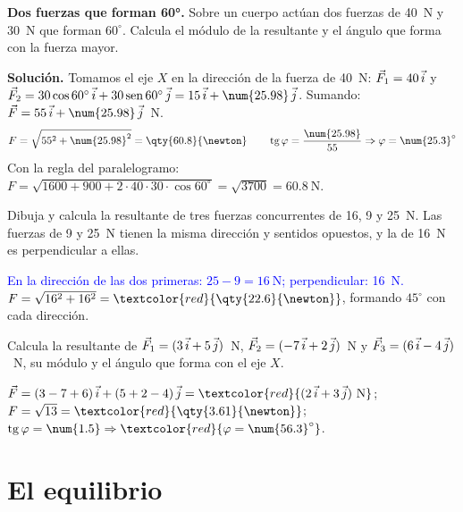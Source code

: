 \begin{example}
    \textbf{Dos fuerzas que forman 60°.} Sobre un cuerpo actúan dos fuerzas de \qty{40}{\newton} y \qty{30}{\newton} que forman
    \(60^\circ\). Calcula el módulo de la resultante y el ángulo que forma con la fuerza mayor.

    \textbf{Solución.} Tomamos el eje \(X\) en la dirección de la fuerza de \qty{40}{\newton}:
    \(\vec{F}_1 = 40\,\vec{i}\) y \(\vec{F}_2 = 30\cos 60^\circ\,\ivec + 30\sen 60^\circ\,\jvec = 15\,\ivec + \num{25.98}\,\jvec\). Sumando:
    \(\vec{F} = 55\,\ivec + \num{25.98}\,\jvec\)~N.
    \[ F = \sqrt{55^2 + \num{25.98}^2} = \qty{60.8}{\newton} \qquad \tg\varphi = \frac{\num{25.98}}{55} \Rightarrow \varphi = \num{25.3}^\circ \]
    Con la regla del paralelogramo: \(F = \sqrt{1600 + 900 + 2 \cdot 40 \cdot 30 \cdot \cos 60^\circ} = \sqrt{3700} = \qty{60.8}{\newton}\).
\end{example}

\begin{exercise}
    Dibuja y calcula la resultante de tres fuerzas concurrentes de 16, 9 y \qty{25}{\newton}. Las fuerzas de 9 y \qty{25}{\newton}
    tienen la misma dirección y sentidos opuestos, y la de \qty{16}{\newton} es perpendicular a ellas.
    \begin{solu}
        \textcolor{blue}{En la dirección de las dos primeras: \(25 - 9 = \qty{16}{\newton}\); perpendicular: \qty{16}{\newton}.}
        \(F = \sqrt{16^2 + 16^2} = \textcolor{red}{\qty{22.6}{\newton}}\), formando \(45^\circ\) con cada dirección.
    \end{solu}
\end{exercise}

\begin{exercise}
    Calcula la resultante de \(\vec{F}_1 = (3\,\vec{i} + 5\,\vec{j})\)~N, \(\vec{F}_2 = (-7\,\vec{i} + 2\,\vec{j})\)~N y
    \(\vec{F}_3 = (6\,\vec{i} - 4\,\vec{j})\)~N, su módulo y el ángulo que forma con el eje \(X\).
    \begin{solu}
        \(\vec{F} = (3 - 7 + 6)\,\ivec + (5 + 2 - 4)\,\jvec = \textcolor{red}{(2\,\ivec + 3\,\jvec)~\text{N}}\);
        \(F = \sqrt{13} = \textcolor{red}{\qty{3.61}{\newton}}\); \(\tg\varphi = \num{1.5} \Rightarrow \textcolor{red}{\varphi = \num{56.3}^\circ}\).
    \end{solu}
\end{exercise}

\section{El equilibrio}\label{sec:ud10-equilibrio}

